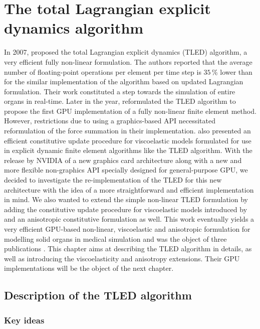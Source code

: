 \chapter{The total Lagrangian explicit dynamics algorithm}
\label{chap5}
\begin{shortAbstract}
In 2007, \citeauthor{Miller07} proposed the total Lagrangian explicit dynamics (TLED) algorithm, a very efficient fully non-linear formulation. The authors reported that the average number of floating-point operations per element per time step is $35\, $\% lower than for the similar implementation of the algorithm based on updated Lagrangian formulation. Their work constituted a step towards the simulation of entire organs in real-time. Later in the year, \citeauthor{Taylor07b} reformulated the TLED algorithm to propose the first GPU implementation of a fully non-linear finite element method. However, restrictions due to using a graphics-based API necessitated reformulation of the force summation in their implementation. \cite{Taylor07a} also presented an efficient constitutive update procedure for viscoelastic models formulated for use in explicit dynamic finite element algorithms like the TLED algorithm. With the release by NVIDIA of a new graphics card architecture along with a new and more flexible non-graphics API specially designed for general-purpose GPU, we decided to investigate the re-implementation of the TLED for this new architecture with the idea of a more straightforward and efficient implementation in mind. We also wanted to extend the simple non-linear TLED formulation by adding the constitutive update procedure for viscoelastic models introduced by \citeauthor{Taylor07a} and an anisotropic constitutive formulation as well. This work eventually yields a very efficient GPU-based non-linear, viscoelastic and anisotropic formulation for modelling solid organs in medical simulation and was the object of three publications \citep{Comas2008,Taylor2008,Taylor2009}. This chapter aims at describing the TLED algorithm in details, as well as introducing the viscoelasticity and anisotropy extensions. Their GPU implementations will be the object of the next chapter. 
\end{shortAbstract}


\section{Description of the TLED algorithm}

	\subsection{Key ideas}

